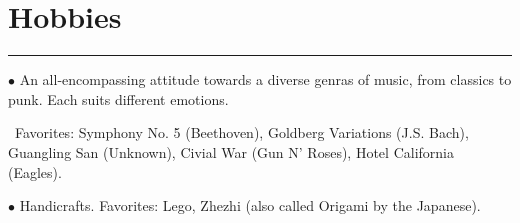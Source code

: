 \documentclass[letterpaper]{article}
\def\footerlink{}
\renewenvironment{itemize}{
  \begin{list}{}{
    \setlength{\leftmargin}{.5em}
  }
}{
  \end{list}
}
\begin{document}


%


\section*{Hobbies}
\vspace{-8pt}
\hrule height .7pt
\smallskip
\begin{itemize}
    \item $\bullet$ An all-encompassing attitude towards a diverse
        genras of music, from classics to punk. Each suits different
        emotions.

        $\,$ Favorites:
        Symphony No. 5 (Beethoven), Goldberg Variations (J.S. Bach),
        Guangling San (Unknown), Civial War (Gun N' Roses), Hotel
        California (Eagles).
    \item $\bullet$ Handicrafts. Favorites: Lego, Zhezhi
        (also called Origami by the Japanese).
\end{itemize}
\end{document}
